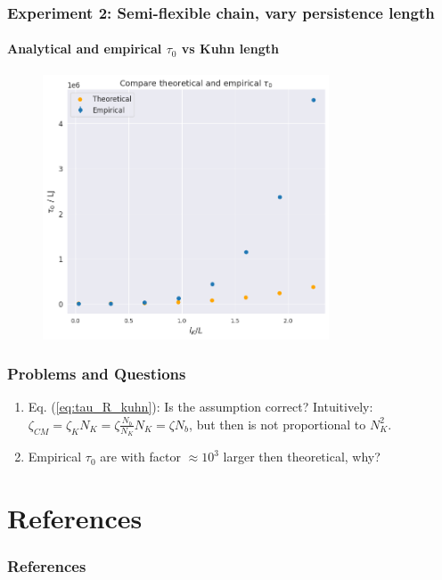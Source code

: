 \documentclass[handout]{beamer}
\begin{document}
\begin{frame}
    \frametitle{Experiment 2: Semi-flexible chain, vary persistence length}
    \framesubtitle{Analytical and empirical $\tau_0$ vs Kuhn length}

    \begin{figure}[h]
        \includegraphics[width=8.5cm]{./4-exp-rouse-times.png}
    \end{figure}
\end{frame}

\begin{frame}
    \frametitle{Problems and Questions}
    \begin{enumerate}
        \item Eq. (\ref{eq:tau_R_kuhn}): Is the assumption correct? 
        Intuitively: $\zeta_{CM}=\zeta_K N_K=\zeta \frac{N_b}{N_K} N_K=\zeta N_b$, but then
        \cite[Eq. 15]{svaneborg_2020} is not proportional to $N_K^2$.
        \item Empirical $\tau_0$ are with factor $\approx 10^3$ larger then theoretical, why?
    \end{enumerate}
\end{frame}

\section{References}

\begin{frame}
    \frametitle{References}
    
    
\end{frame}
\end{document}
